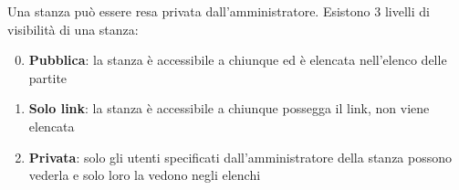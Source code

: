 Una stanza può essere resa privata dall'amministratore. Esistono 3 livelli di visibilità di una stanza:

\begin{enumerate}
	\setcounter{enumi}{-1}
	\item \textbf{Pubblica}: la stanza è accessibile a chiunque ed è elencata nell'elenco delle partite
	\item \textbf{Solo link}: la stanza è accessibile a chiunque possegga il link, non viene elencata
	\item \textbf{Privata}: solo gli utenti specificati dall'amministratore della stanza possono vederla e solo loro la vedono negli elenchi
\end{enumerate}